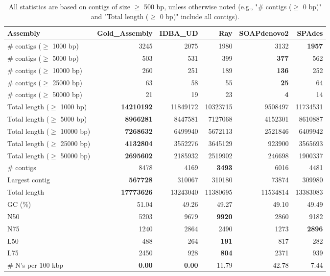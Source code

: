 \documentclass[12pt,a4paper]{article}
\begin{document}
\begin{table}[ht]
\begin{center}
\caption{All statistics are based on contigs of size $\geq$ 500 bp, unless otherwise noted (e.g., "\# contigs ($\geq$ 0 bp)" and "Total length ($\geq$ 0 bp)" include all contigs).}
\begin{tabular}{|l*{5}{|r}|}
\hline
Assembly & Gold\_Assembly & IDBA\_UD & Ray & SOAPdenovo2 & SPAdes \\ \hline
\# contigs ($\geq$ 1000 bp) & 3245 & 2075 & 1980 & 3132 & {\bf 1957} \\ \hline
\# contigs ($\geq$ 5000 bp) & 503 & 531 & 399 & {\bf 377} & 562 \\ \hline
\# contigs ($\geq$ 10000 bp) & 260 & 251 & 189 & {\bf 136} & 252 \\ \hline
\# contigs ($\geq$ 25000 bp) & 63 & 58 & 55 & {\bf 25} & 64 \\ \hline
\# contigs ($\geq$ 50000 bp) & 21 & 19 & 23 & {\bf 4} & 14 \\ \hline
Total length ($\geq$ 1000 bp) & {\bf 14210192} & 11849172 & 10323715 & 9508497 & 11734531 \\ \hline
Total length ($\geq$ 5000 bp) & {\bf 8966281} & 8447581 & 7127068 & 4152301 & 8610887 \\ \hline
Total length ($\geq$ 10000 bp) & {\bf 7268632} & 6499940 & 5672113 & 2521846 & 6409942 \\ \hline
Total length ($\geq$ 25000 bp) & {\bf 4132804} & 3552276 & 3645129 & 923900 & 3565693 \\ \hline
Total length ($\geq$ 50000 bp) & {\bf 2695602} & 2185932 & 2519902 & 246698 & 1900337 \\ \hline
\# contigs & 8478 & 4169 & {\bf 3493} & 6016 & 4481 \\ \hline
Largest contig & {\bf 567728} & 310067 & 310180 & 73874 & 309980 \\ \hline
Total length & {\bf 17773626} & 13243040 & 11380695 & 11534814 & 13383083 \\ \hline
GC (\%) & 51.04 & 49.26 & 49.27 & 49.10 & 49.49 \\ \hline
N50 & 5203 & 9679 & {\bf 9920} & 2860 & 9182 \\ \hline
N75 & 1240 & 2864 & 2490 & 1273 & {\bf 2896} \\ \hline
L50 & 488 & 264 & {\bf 191} & 817 & 282 \\ \hline
L75 & 2450 & 928 & {\bf 804} & 2371 & 939 \\ \hline
\# N's per 100 kbp & {\bf 0.00} & {\bf 0.00} & 11.79 & 42.78 & 7.44 \\ \hline
\end{tabular}
\end{center}
\end{table}
\end{document}
